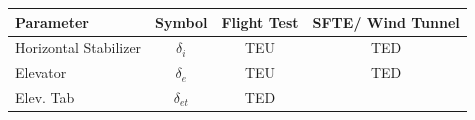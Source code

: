\documentclass[
]{book}
\begin{document}
\begin{longtable}[]{@{}lccc@{}}
\toprule
\begin{minipage}[b]{0.19\columnwidth}\raggedright
\textbf{Parameter}\strut
\end{minipage} & \begin{minipage}[b]{0.14\columnwidth}\centering
\textbf{Symbol}\strut
\end{minipage} & \begin{minipage}[b]{0.29\columnwidth}\centering
\textbf{Flight Test}\strut
\end{minipage} & \begin{minipage}[b]{0.27\columnwidth}\centering
\textbf{SFTE/}
\textbf{Wind Tunnel}\strut
\end{minipage}\tabularnewline
\midrule
\endhead
\begin{minipage}[t]{0.19\columnwidth}\raggedright
Horizontal Stabilizer\strut
\end{minipage} & \begin{minipage}[t]{0.14\columnwidth}\centering
\(\delta_i\)\strut
\end{minipage} & \begin{minipage}[t]{0.29\columnwidth}\centering
TEU\strut
\end{minipage} & \begin{minipage}[t]{0.27\columnwidth}\centering
TED\strut
\end{minipage}\tabularnewline
\begin{minipage}[t]{0.19\columnwidth}\raggedright
Elevator\strut
\end{minipage} & \begin{minipage}[t]{0.14\columnwidth}\centering
\(\delta_e\)\strut
\end{minipage} & \begin{minipage}[t]{0.29\columnwidth}\centering
TEU\strut
\end{minipage} & \begin{minipage}[t]{0.27\columnwidth}\centering
TED\strut
\end{minipage}\tabularnewline
\begin{minipage}[t]{0.19\columnwidth}\raggedright
Elev. Tab\strut
\end{minipage} & \begin{minipage}[t]{0.14\columnwidth}\centering
\(\delta_{et}\)\strut
\end{minipage} & \begin{minipage}[t]{0.29\columnwidth}\centering
TED\strut
\end{minipage} & \begin{minipage}[t]{0.27\columnwidth}\centering

\end{minipage}
\end{longtable}
\end{document}

